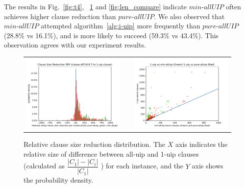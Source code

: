 \documentclass[runningheads]{llncs}
\newcommand{\fss}[2]{\fontsize{#1}{#2}\selectfont}
\newcommand{\allUipPure}{\textit{pure-allUIP}\xspace}
\newcommand{\allUipMin}{\textit{min-allUIP}\xspace}
\begin{document}
The results in Fig.~\ref{fig:t4}, ~\ref{fig:len_pdf} and
\ref{fig:len_compare} indicate $\allUipMin$ often achieves higher
clause reduction than $\allUipPure$. We also observed that
$\allUipMin$ attempted algorithm~\ref{alg:i-uip} more frequently than
$\allUipPure$ (28.8\% vs 16.1\%), and is more likely to succeed
(59.3\% vs 43.4\%). This observation agrees with our experiment
results.

\begin{figure}[t!]
{\fss{8pt}{10pt}
\begin{tabular}[t]{l c l}
  
  \begin{minipage}[t]{0.5\textwidth}
   \includegraphics[width=\textwidth]{figures/clause_reduction_PDF.pdf}
   \caption{Relative clause size reduction distribution. The $X$ axis
      indicates the relative size of difference between all-uip and
      1-uip clauses (calculated as
      $\dfrac{|C_1|-|C_i|}{|C_1|}$ ) for
      each instance, and the $Y$ axis shows the probability density.}
       \label{fig:len_pdf}
  \end{minipage}
  & &
  \begin{minipage}[t]{0.5\textwidth}
    \includegraphics[width=\textwidth]{figures/clause_size_compare.pdf}

\end{minipage}
\end{tabular}}
\end{figure}
\end{document}
